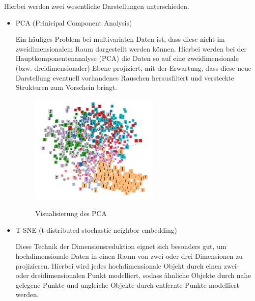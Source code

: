 Hierbei werden zwei wesentliche Darstellungen unterschieden.
\vspace{10pt}

\begin{itemize} 
\item PCA (Prinicipal Component Analysis) \vspace{10pt}

Ein häufiges Problem bei multivariaten Daten ist, dass diese nicht im zweidimensionalem Raum dargestellt werden können.  Hierbei werden bei der Hauptkomponentenanalyse (PCA) die Daten so auf eine zweidimensionale (bzw. dreidimensionaler) Ebene projiziert, mit der Erwartung, dass diese neue Darstellung eventuell vorhandenes Rauschen herausfiltert und versteckte Strukturen zum Vorschein bringt.   
\begin{figure}[h!]
	\centering
	 \includegraphics[width=0.6\textwidth]{images/Kapitel_3/projektor_pca.png}\\
	\vspace{10pt} 
	\caption[Visualisierung des PCA]{Visualisierung des PCA}
	\label{fig:pca}
\end{figure}



\item T-SNE (t-distributed stochastic neighbor embedding) \vspace{10pt}

Diese Technik der Dimensionsreduktion eignet sich besonders gut, um hochdimensionale Daten in einen Raum von zwei oder drei Dimensionen zu projizieren. Hierbei wird jedes hochdimensionale Objekt durch einen zwei- oder dreidimensionalen Punkt modelliert, sodass ähnliche Objekte durch nahe gelegene Punkte und ungleiche Objekte durch entfernte Punkte modelliert werden.



\end{itemize}
